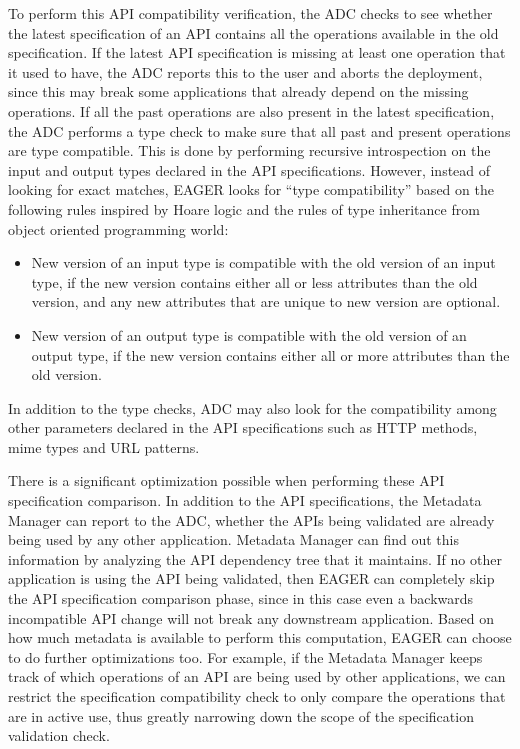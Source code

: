 To perform this API compatibility verification, the ADC checks to see whether the latest specification of an API contains all 
the operations available in the old specification. If the latest API specification is missing at least one operation that it used to have, the ADC
reports this to the user and aborts the deployment, since this may break some applications that already depend on the missing operations. 
If all the past operations are also present in the latest specification, the ADC performs a type check to make sure that 
all past and present operations are type compatible. This is done by performing recursive introspection on the input and output types declared in the
API specifications. However, instead of looking for exact matches, EAGER looks for ``type compatibility'' based on the following rules inspired by Hoare
logic and the rules of type inheritance from object oriented programming world:
\begin{itemize}
\item New version of an input type is compatible with the old version of an input type, if the new version contains either all or less attributes than the 
old version, and any new attributes that are unique to new version are optional.
\item New version of an output type is compatible with the old version of an output type, if the new version contains either all or more attributes than the 
old version.
\end{itemize}
In addition to the type checks, ADC may also look for the compatibility among other parameters declared in the API specifications
such as HTTP methods, mime types and URL patterns.

There is a significant optimization possible when performing these API specification comparison. In addition to the API specifications,
the Metadata Manager can report to the ADC, whether the APIs being validated are already being used by any other application. Metadata Manager
can find out this information by analyzing the API dependency tree that it maintains. If no other application is using the API being validated, then EAGER
can completely skip the API specification comparison phase, since in this case even a backwards incompatible API change will not break any 
downstream application. 
Based on how much metadata is available to perform this computation, EAGER can choose to do further optimizations too. For example, if
the Metadata Manager keeps track of which operations of an API are being used by other applications, we can restrict the specification compatibility
check to only compare the operations that are in active use, thus greatly narrowing down the scope of the specification validation check.

